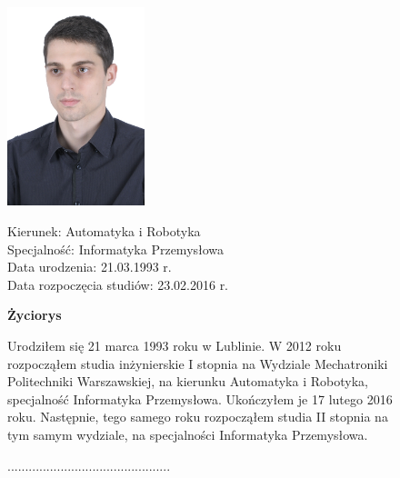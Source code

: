\begin{figure}[ht]
\begin{doublespacing}
	\begin{minipage}[b]{0.4\linewidth}
		\includegraphics[width=4cm]{img/cv/me}
	\end{minipage}
	\begin{minipage}[b]{0.5\linewidth}
		Kierunek:  Automatyka i Robotyka \\
		Specjalność:  Informatyka Przemysłowa \\
		Data urodzenia:  21.03.1993 r. \\
		Data rozpoczęcia studiów:  23.02.2016 r. \\
	\end{minipage}
	
	\hspace{2cm}
	
	\begin{center}
		\huge{\textbf{Życiorys}} \\
	\end{center}

Urodziłem się 21 marca 1993 roku w Lublinie. W 2012 roku rozpocząłem studia inżynierskie I stopnia na Wydziale Mechatroniki Politechniki Warszawskiej, na kierunku Automatyka i Robotyka, specjalność Informatyka Przemysłowa. Ukończyłem je 17 lutego 2016 roku. Następnie, tego samego roku rozpocząłem studia II stopnia na tym samym wydziale, na specjalności Informatyka Przemysłowa. \\

	\vspace{2cm}
	\begin{flushright}
				.............................................. \\
	\end{flushright}
\end{doublespacing}
\end{figure}


